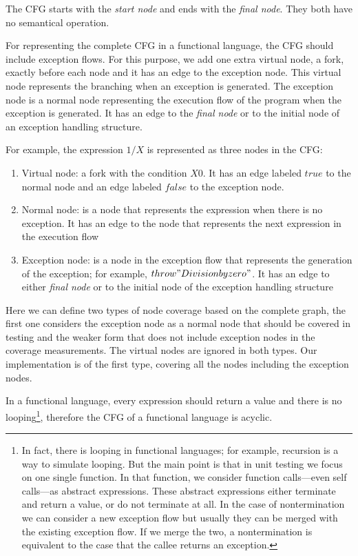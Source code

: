 \documentclass[12pt,a4paper]{report}
\begin{document}
The CFG starts with the \emph{start node} and ends with the \emph{final node}. They both have no semantical operation.

For representing the complete CFG in a functional language, the CFG should include exception flows. For this purpose, we add one extra virtual node, a fork, exactly before each node and it has an edge to the exception node. This virtual node represents the branching when an exception is generated. The exception node is a normal node representing the execution flow of the program when the exception is generated. It has an edge to the \emph{final node} or to the initial node of an exception handling structure. 

For example, the expression $1/X$ is represented as three nodes in the CFG:
\begin{enumerate}
 \item Virtual node: a fork with the condition $X$\neq$0$. It has an edge labeled $true$ to the normal node and an edge labeled $false$ to the exception node.
 \item Normal node: is a node that represents the expression when there is no exception. It has an edge to the node that represents the next expression in the execution flow
 \item Exception node: is a node in the exception flow that represents the generation of the exception; for example, $throw "Division by zero"$. It has an edge to either \emph{final node} or to the initial node of the exception handling structure
\end{enumerate}

Here we can define two types of node coverage based on the complete graph, the first one considers the exception node as a normal node that should be covered in testing and the weaker form that does not include exception nodes in the coverage measurements. The virtual nodes are ignored in both types. Our implementation is of the first type, covering all the nodes including the exception nodes.

In a functional language, every expression should return a value and there is no looping\footnote{In fact, there is looping in functional languages; for example, recursion is a way to simulate looping. But the main point is that in unit testing we focus on one single function. In that function, we consider function calls---even self calls---as abstract expressions. These abstract expressions either terminate and return a value, or do not terminate at all. In the case of nontermination we can consider a new exception flow but usually they can be merged with the existing exception flow. If we merge the two, a nontermination is equivalent to the case that the callee returns an exception.}, therefore the CFG of a functional language is acyclic.
\end{document}
